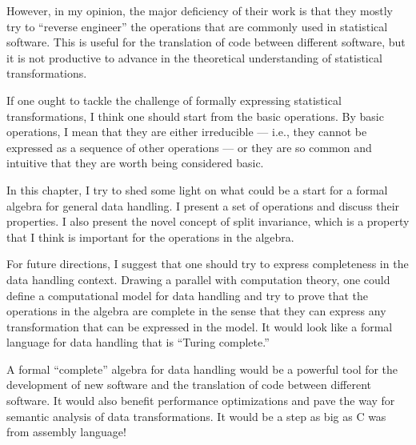 However, in my opinion, the major deficiency of their work is that they mostly try to
``reverse engineer'' the operations that are commonly used in statistical software.  This
is useful for the translation of code between different software, but it is not productive
to advance in the theoretical understanding of statistical transformations.

If one ought to tackle the challenge of formally expressing statistical transformations, I
think one should start from the basic operations.  By basic operations, I mean that they
are either irreducible --- i.e., they cannot be expressed as a sequence of other
operations --- or they are so common and intuitive that they are worth being considered
basic.

In this chapter, I try to shed some light on what could be a start for a formal algebra
for general data handling.  I present a set of operations and discuss their properties. I
also present the novel concept of split invariance, which is a property that I think is
important for the operations in the algebra.

For future directions, I suggest that one should try to express completeness in the data
handling context.  Drawing a parallel with computation theory, one could define a
computational model for data handling and try to prove that the operations in the algebra
are complete in the sense that they can express any transformation that can be expressed
in the model.  It would look like a formal language for data handling that is ``Turing
complete.''

A formal ``complete'' algebra for data handling would be a powerful tool for the
development of new software and the translation of code between different software.  It
would also benefit performance optimizations and pave the way for semantic analysis of
data transformations.  It would be a step as big as C was from assembly language!

